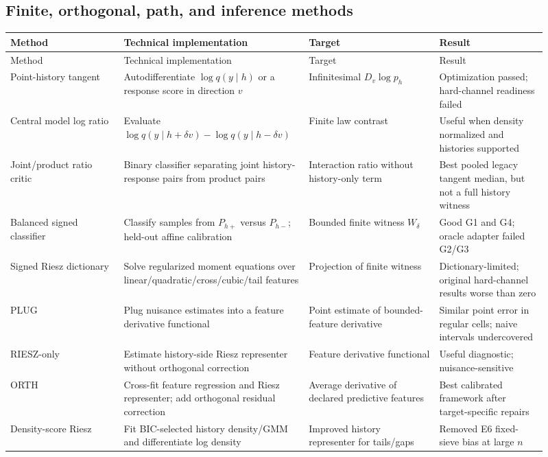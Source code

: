\documentclass[10pt]{article}
\begin{document}
\subsection{Finite, orthogonal, path, and inference methods}

\begin{longtable}{L{0.20\linewidth}L{0.29\linewidth}L{0.23\linewidth}L{0.19\linewidth}}
\toprule
Method & Technical implementation & Target & Result \\
\midrule
\endfirsthead
\toprule Method & Technical implementation & Target & Result \\
\midrule\endhead
Point-history tangent & Autodifferentiate $\log q(y\mid h)$ or a response score in direction $v$ & Infinitesimal $D_v\log p_h$ & Optimization passed; hard-channel readiness failed \\
Central model log ratio & Evaluate $\log q(y\mid h+\delta v)-\log q(y\mid h-\delta v)$ & Finite law contrast & Useful when density normalized and histories supported \\
Joint/product ratio critic & Binary classifier separating joint history-response pairs from product pairs & Interaction ratio without history-only term & Best pooled legacy tangent median, but not a full history witness \\
Balanced signed classifier & Classify samples from $P_{h+}$ versus $P_{h-}$; held-out affine calibration & Bounded finite witness $W_\delta$ & Good G1 and G4; oracle adapter failed G2/G3 \\
Signed Riesz dictionary & Solve regularized moment equations over linear/quadratic/cross/cubic/tail features & Projection of finite witness & Dictionary-limited; original hard-channel results worse than zero \\
PLUG & Plug nuisance estimates into a feature derivative functional & Point estimate of bounded-feature derivative & Similar point error in regular cells; naive intervals undercovered \\
RIESZ-only & Estimate history-side Riesz representer without orthogonal correction & Feature derivative functional & Useful diagnostic; nuisance-sensitive \\
ORTH & Cross-fit feature regression and Riesz representer; add orthogonal residual correction & Average derivative of declared predictive features & Best calibrated framework after target-specific repairs \\
Density-score Riesz & Fit BIC-selected history density/GMM and differentiate log density & Improved history representer for tails/gaps & Removed E6 fixed-sieve bias at large $n$ \\

\end{longtable}
\end{document}
